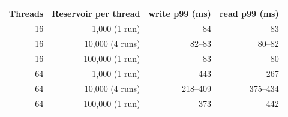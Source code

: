 \begin{tabular}{rrrr}
\toprule
Threads & Reservoir per thread & write p99 (ms) & read p99 (ms) \\
\midrule
16 & 1{,}000 (1 run) & 84 & 83 \\
16 & 10{,}000 (4 runs) & 82--83 & 80--82 \\
16 & 100{,}000 (1 run) & 83 & 80 \\
64 & 1{,}000 (1 run) & 443 & 267 \\
64 & 10{,}000 (4 runs) & 218--409 & 375--434 \\
64 & 100{,}000 (1 run) & 373 & 442 \\
\bottomrule
\end{tabular}

